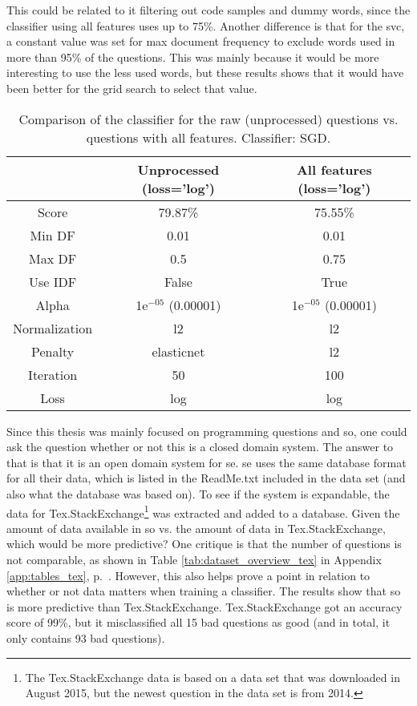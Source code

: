 This could be related to it filtering out code samples and dummy words, since the classifier using all features uses up to 75\%.
Another difference is that for the \gls{svc}, a constant value was set for max document frequency to exclude words used in more than 95\% of the questions. 
This was mainly because it would be more interesting to use the less used words, but these results shows that it would have been better for the grid search to select that value.
\begin{table}[!h]%
	\centering
	\begin{tabular}{| c | c | c |}
		\hline
		~				& Unprocessed (loss='log')	& All features (loss='log')	\\ \hline
		Score 			& 79.87\%					& 75.55\%					\\ \hline
		Min DF 			& 0.01						& 0.01						\\ \hline
		Max DF 			& 0.5						& 0.75						\\ \hline
		Use IDF			& False						& True						\\ \hline
		Alpha 			& 1e$^{-05}$ (0.00001)		& 1e$^{-05}$ (0.00001)		\\ \hline
		Normalization 	& l2						& l2						\\ \hline		
		Penalty 		& elasticnet				& l2						\\ \hline
		Iteration 		& 50						& 100						\\ \hline
		Loss 			& log						& log						\\ \hline		
	\end{tabular}
	\caption{Comparison of the classifier for the raw (unprocessed) questions vs. questions with all features. Classifier: SGD.}
	\label{tab:unprocessed_vs_all_feature_detectors_sgd_so}
\end{table}
\vspace{0.5em}\newline
Since this thesis was mainly focused on programming questions and \gls{so}, one could ask the question whether or not this is a closed domain system. 
The answer to that is that it is an open domain system for \gls{se}.
\gls{se} uses the same database format for all their data, which is listed in the ReadMe.txt included in the data set (and also what the database was based on).
To see if the system is expandable, the data for Tex.StackExchange\footnote{
	The Tex.StackExchange data is based on a data set that was downloaded in August 2015, but the newest question in the data set is from 2014.
} was extracted and added to a database. 
Given the amount of data available in \gls{so} vs. the amount of data in Tex.StackExchange, which would be more predictive?
One critique is that the number of questions is not comparable, as shown in Table \ref{tab:dataset_overview_tex} in Appendix \ref{app:tables_tex}, p.~\pageref{app:tables_tex}.
However, this also helps prove a point in relation to whether or not data matters when training a classifier.
The results show that \gls{so} is more predictive than Tex.StackExchange.
Tex.StackExchange got an accuracy score of 99\%, but it misclassified all 15 bad questions as good (and in total, it only contains 93 bad questions).


